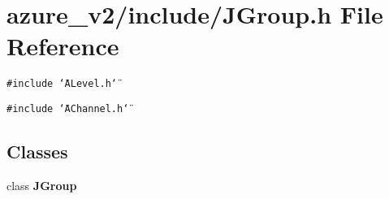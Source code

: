 \section{azure\_\-v2/include/JGroup.h File Reference}
\label{JGroup_8h}
{\tt \#include \char`\"{}ALevel.h\char`\"{}}\par
{\tt \#include \char`\"{}AChannel.h\char`\"{}}\par
\subsection*{Classes}
\begin{CompactItemize}
\item 
class \bf{JGroup}
\end{CompactItemize}

